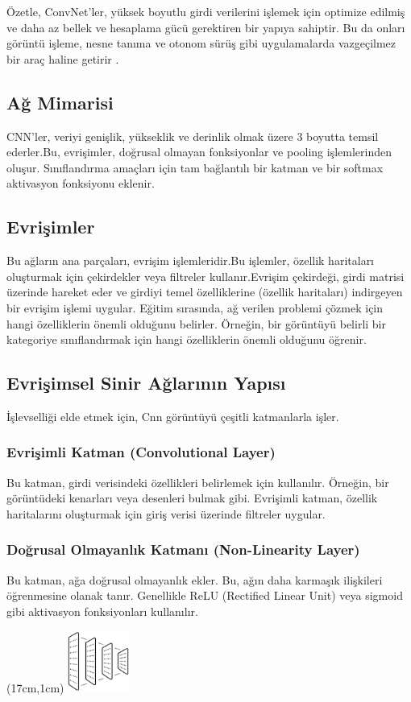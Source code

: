 \documentclass{article}
\begin{document}
\noindent Özetle, ConvNet'ler, yüksek boyutlu girdi verilerini işlemek için optimize edilmiş ve daha az bellek ve hesaplama gücü gerektiren bir yapıya sahiptir. Bu da onları görüntü işleme, nesne tanıma ve otonom sürüş gibi uygulamalarda vazgeçilmez bir araç haline getirir
.
\subsection{Ağ Mimarisi}
CNN'ler, veriyi genişlik, yükseklik ve derinlik olmak üzere 3 boyutta temsil ederler.Bu, evrişimler, doğrusal olmayan fonksiyonlar ve pooling işlemlerinden oluşur. Sınıflandırma amaçları için tam bağlantılı bir katman ve bir softmax aktivasyon fonksiyonu eklenir. 


\subsection{Evrişimler}
Bu ağların ana parçaları, evrişim işlemleridir.Bu işlemler, özellik haritaları oluşturmak için çekirdekler veya filtreler kullanır.Evrişim çekirdeği, girdi matrisi üzerinde hareket eder ve girdiyi temel özelliklerine (özellik haritaları) indirgeyen bir evrişim işlemi uygular. Eğitim sırasında, ağ verilen problemi çözmek için hangi özelliklerin önemli olduğunu belirler. Örneğin, bir görüntüyü belirli bir kategoriye sınıflandırmak için hangi özelliklerin önemli olduğunu öğrenir.

\subsection{Evrişimsel Sinir Ağlarının Yapısı}
İşlevselliği elde etmek için, Cnn görüntüyü çeşitli katmanlarla işler. 
\subsubsection{Evrişimli Katman (Convolutional Layer)}
Bu katman, girdi verisindeki özellikleri belirlemek için kullanılır. Örneğin, bir görüntüdeki kenarları veya desenleri bulmak gibi. Evrişimli katman, özellik haritalarını oluşturmak için giriş verisi üzerinde filtreler uygular.
\subsubsection{Doğrusal Olmayanlık Katmanı (Non-Linearity Layer)}
 Bu katman, ağa doğrusal olmayanlık ekler. Bu, ağın daha karmaşık ilişkileri öğrenmesine olanak tanır. Genellikle ReLU (Rectified Linear Unit) veya sigmoid gibi aktivasyon fonksiyonları kullanılır.
\newpage
\begin{textblock*}{5cm}(17cm,1cm) %
    \includegraphics[width=2cm]{image/Resim45.png} %
\end{textblock*}
\end{document}
